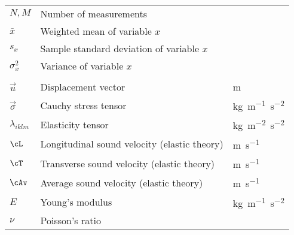 \begin{center}
\begin{tabular}{p{2cm}p{8cm}p{3cm}}
$N,M$			    		& Number of measurements						& \SI{}{} \\
$\bar{x}$		    		& Weighted mean of variable $x$					& \SI{}{} \\
$s_x$			    		& Sample standard deviation of variable $x$		& \SI{}{} \\
$\sigma_x^2$			    & Variance of variable $x$						& \SI{}{} \\\\

$\vec{u}$			        & Displacement vector							& \SI{m}{} \\
$\vec{\sigma}$            	& Cauchy stress tensor							& \SI{kg}{m^{-1}s^{-2}} \\
$\lambda_{iklm}$         	& Elasticity tensor								& \SI{kg}{m^{-2}s^{-2}} \\
$\cL$			          	& Longitudinal sound velocity (elastic theory)	& \SI{m}{s^{-1}} \\
$\cT$			          	& Transverse sound velocity (elastic theory)	& \SI{m}{s^{-1}} \\
$\cAv$			          	& Average sound velocity (elastic theory)		& \SI{m}{s^{-1}} \\
$E$			          		& Young's modulus								& \SI{kg}{m^{-1}s^{-2}} \\
$\nu$			          	& Poisson's ratio								& \SI{}{} \\
\hline
\end{tabular}
\end{center}


